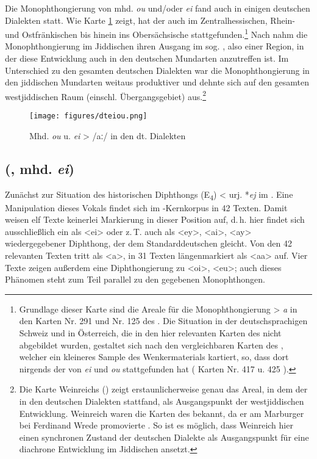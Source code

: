 Die Monophthongierung von mhd. \textit{ou} und/oder \textit{ei} fand auch in einigen  deutschen Dialekten statt. Wie Karte \ref{dteiou} zeigt, hat der  auch im Zentralhessischen, Rhein- und Ostfränkischen bis hinein ins Obersächsische stattgefunden.\footnote{Grundlage dieser Karte sind die Areale für die Monophthongierung > \textit{a} in den Karten Nr. 291  und Nr. 125  des . Die Situation in der deutschsprachigen Schweiz und in Österreich, die in den hier relevanten Karten des  nicht abgebildet wurden, gestaltet sich nach den vergleichbaren Karten des , welcher ein kleineres Sample des Wenkermaterials kartiert, so, dass dort nirgends der  von \textit{ei} und \textit{ou} stattgefunden hat ( Karten Nr. 417  u. 425 ).} Nach \textcite[66]{Weinreich1953} nahm die Monophthongierung im Jiddischen ihren Ausgang im sog. , also einer Region, in der diese Entwicklung auch in den deutschen Mundarten anzutreffen ist. Im Unterschied zu den gesamten deutschen Dialekten war die Monophthongierung in den jiddischen Mundarten weitaus produktiver und dehnte sich auf den gesamten westjiddischen Raum (einschl. Übergangsgebiet) aus.\footnote{Die Karte Weinreichs (\citeyear[66]{Weinreich1953}) zeigt erstaunlicherweise genau das Areal, in dem der  in den deutschen Dialekten stattfand, als Ausgangspunkt der westjiddischen Entwicklung. Weinreich waren die Karten des  bekannt, da er am Marburger  bei Ferdinand Wrede promovierte \parencite{Weinreich1923}. So ist es möglich, dass Weinreich hier einen synchronen Zustand der deutschen Dialekte als Ausgangspunkt für eine diachrone Entwicklung im Jiddischen ansetzt.}\\ 

\begin{figure}[h!]
\centering
\texttt{[image: figures/dteiou.png]}
		\caption{\label{dteiou} Mhd. \textit{ou} u. \textit{ei} > /aː/ in den dt. Dialekten}
		\end{figure} 
\FloatBarrier
 
\subsection{ (, mhd. \textit{ei})}\label{phonV24}
Zunächst zur Situation des historischen Diphthongs  (E\textsubscript{4}) < urj. *\textit{ej} im . Eine Manipulation dieses Vokals findet sich im -Kernkorpus in 42 Texten. Damit weisen elf Texte keinerlei Markierung in dieser Position auf, d.\,h. hier findet sich ausschließlich ein als <ei> oder z.\,T. auch als <ey>, <ai>, <ay> wiedergegebener Diphthong, der dem Standarddeutschen gleicht. Von den 42 relevanten Texten tritt  als <a>, in 31 Texten längenmarkiert als <aa>  auf. Vier Texte zeigen außerdem eine Diphthongierung zu <oi>, <eu>; auch dieses Phänomen steht zum Teil parallel zu den gegebenen Monophthongen.  

